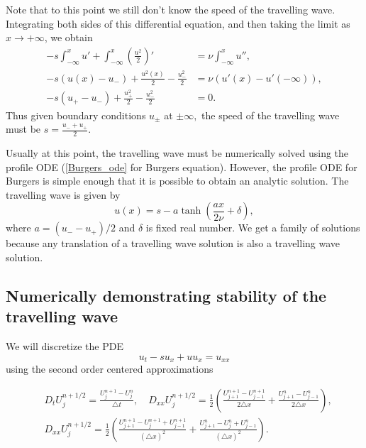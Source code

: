 Note that to this point we still don't know the speed of the travelling wave.  Integrating both sides of this differential equation, and then taking the limit as $x \to +\infty$, we obtain
\begin{align*}
-s\int_{-\infty}^x u' + \int_{-\infty}^x \left(\frac{u^2}{2}\right)' &= \nu \int_{-\infty}^x u'',\\	
-s(u(x) - u_-) + \frac{u^2(x)}{2} - \frac{u_-^2}{2} &= \nu (u'(x) - u'(-\infty)), \\
-s(u_+ - u_-) + \frac{u_+^2}{2} - \frac{u_-^2}{2} &= 0. 
\end{align*}
Thus given boundary conditions $u_{\pm}$ at $\pm \infty,$ the speed of the travelling wave must be $s = \frac{u_- + u_+}{2}.$ 

Usually at this point, the travelling wave must be numerically solved using the profile ODE (\eqref{Burgers_ode} for Burgers equation).  However, the profile ODE for Burgers is simple enough that it is possible to obtain an analytic solution. The travelling wave is  given by 
\[u(x) = s - a \tanh \left(\frac{ax }{2\nu} + \delta\right),\]
where $a = (u_- - u_+)/2$ and $\delta$ is fixed real number. We get a family of solutions because any translation of a travelling wave solution is also a travelling wave solution. 

\subsection{Numerically demonstrating stability of the travelling wave }
We will discretize the PDE
\[u_t -su_x + uu_x = u_{xx}\]
using the second order centered approximations



\begin{align*}
&{ } D_t U_j^{n+1/2} = \frac{U_j^{n+1}-U_j^n}{\triangle t}, \quad 
D_{xx}U_j^{n+1/2} = \frac{1}{2} \left( \frac{U_{j+1}^{n+1}-U_{j-1}^{n+1}}{2 \triangle x} +  \frac{U_{j+1}^{n}-U_{j-1}^{n}}{2 \triangle x}\right) ,\\
&{ } D_{xx}U_j^{n+1/2} = \frac{1}{2} \left( \frac{U_{j+1}^{n+1}- U_{j}^{n+1}+U_{j-1}^{n+1}}{(\triangle x)^2} + \frac{U_{j+1}^{n}- U_{j}^{n}+U_{j-1}^{n}}{(\triangle x)^2}\right).
\end{align*}

